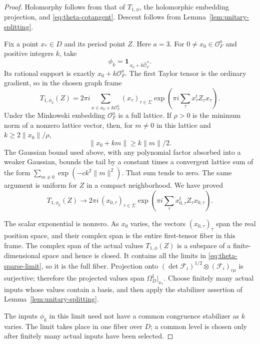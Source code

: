 \begin{proof}
Holomorphy follows from that of \(T_{1,\phi}\), the holomorphic
embedding projection, and \eqref{eq:theta-cotangent}.  Descent
follows from Lemma~\ref{lem:unitary-splitting}.

Fix a point \(x_*\in D\) and its period point \(Z\).  Here \(a=3\).  For
\(0\ne x_0\in\mathcal O_F^a\) and positive integers \(k\), take
\[
 \phi_k=\mathbf1_{\,x_0+k\widehat{\mathcal O}_F^{\,a}}.
\]
Its rational support is exactly \(x_0+k\mathcal O_F^a\).
The first Taylor tensor is the ordinary gradient, so in the
chosen graph frame
\[
 T_{1,\phi_k}(Z)
  =2\pi i\sum_{x\in x_0+k\mathcal O_F^a}
      (x_\tau)_{\tau\in\Sigma}
       \exp\!\left(\pi i\sum_\tau x_\tau^tZ_\tau x_\tau\right).
\]
Under the Minkowski embedding \(\mathcal O_F^a\) is a full
lattice.  If \(\rho>0\) is the minimum norm of a nonzero lattice
vector, then, for \(m\ne0\) in this lattice and
\(k\ge2\|x_0\|/\rho\),
\[
 \|x_0+km\|\ge k\|m\|/2.
\]
The Gaussian bound used above, with any polynomial factor
absorbed into a weaker Gaussian, bounds the tail by a constant
times a convergent lattice sum of the form
\(\sum_{m\ne0}\exp(-c k^2\|m\|^2)\).  That sum tends to zero.
The same argument is uniform for \(Z\) in a compact
neighborhood.  We have proved
\begin{equation}\label{eq:theta-sparse-limit}
 T_{1,\phi_k}(Z)\longrightarrow
  2\pi i\,(x_{0,\tau})_{\tau\in\Sigma}
       \exp\!\left(\pi i\sum_\tau
                       x_{0,\tau}^tZ_\tau x_{0,\tau}\right).
\end{equation}

The scalar exponential is nonzero.  As \(x_0\) varies, the
vectors \((x_{0,\tau})_\tau\) span the real position space,
and their complex span is the entire first-tensor fiber in this
frame.  The complex span of the actual values \(T_{1,\phi}(Z)\)
is a subspace of a finite-dimensional space and hence is closed.
It contains all the limits in \eqref{eq:theta-sparse-limit},
so it is the full fiber.  Projection onto
\((\det\mathcal F_i)^{1/2}\otimes(\mathcal F_i)_{c\mu}\)
is surjective; therefore the projected values span
\(\Omega_D^1|_{x_*}\).  Choose finitely many actual inputs whose
values contain a basis, and then apply the stabilizer assertion
of Lemma~\ref{lem:unitary-splitting}.

The inputs \(\phi_k\) in this limit need not have a common
congruence stabilizer as \(k\) varies.  The limit takes place
in one fiber over \(D\); a common level is chosen only after
finitely many actual inputs have been selected.
\end{proof}


